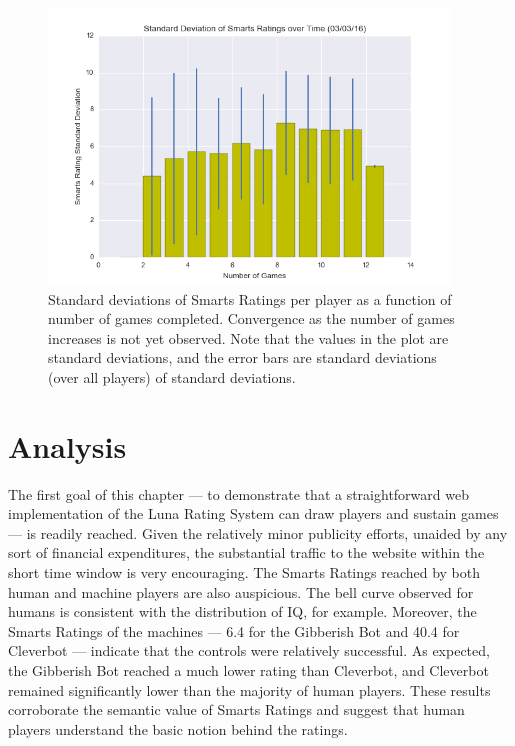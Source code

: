 \begin{figure}
\includegraphics[width=0.95\textwidth]{figures/varianceGamesPlayed.png}
\caption{\label{smartRatingStds} Standard deviations of Smarts Ratings per player as a function of number of games completed. Convergence as the number of games increases is not yet observed. Note that the values in the plot are standard deviations, and the error bars are standard deviations (over all players) of standard deviations.}
\end{figure}

\section{Analysis}

The first goal of this chapter --- to demonstrate that a straightforward web implementation of the Luna Rating System can draw players and sustain games --- is readily reached. Given the relatively minor publicity efforts, unaided by any sort of financial expenditures, the substantial traffic to the website within the short time window is very encouraging. The Smarts Ratings reached by both human and machine players are also auspicious. The bell curve observed for humans is consistent with the distribution of IQ, for example. Moreover, the Smarts Ratings of the machines --- 6.4 for the Gibberish Bot and 40.4 for Cleverbot --- indicate that the controls were relatively successful. As expected, the Gibberish Bot reached a much lower rating than Cleverbot, and Cleverbot remained significantly lower than the majority of human players. These results corroborate the semantic value of Smarts Ratings and suggest that human players understand the basic notion behind the ratings.

